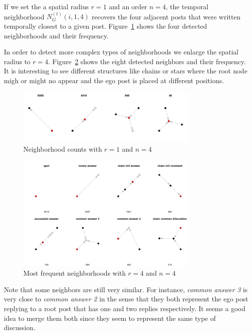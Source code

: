 \documentclass[smallextended]{svjour3}          %
\begin{document}
If we set the a spatial radius $r=1$ and an order $n=4$, the temporal neighborhood $N_{G}^{(t)}(i, 1, 4)$ recovers the four adjacent posts that were written temporally closest to a given post. Figure~\ref{fig:neighborhoods_1_4} shows the four detected neighborhoods and their frequency.

In order to detect more complex types of neighborhoods we enlarge the spatial radius to $r=4$. Figure~\ref{fig:neighborhoods_4_4} shows the eight detected neighbors and their frequency. It is interesting to see different structures like chains or stars where the root node migh or might no appear and the ego post is placed at different positions.

\begin{figure}
	\centering
	\includegraphics[width=0.8\textwidth]{neighborhoods_1_4}
	\caption{Neighborhood counts with $r=1$ and $n=4$}
	\label{fig:neighborhoods_1_4}
\end{figure}

\begin{figure}
	\centering
	\includegraphics[width=0.8\textwidth]{neighborhoods_4_4}
	\caption{Most frequent neighborhoods with $r=4$ and $n=4$}
	\label{fig:neighborhoods_4_4}
\end{figure}

Note that some neighbors are still very similar. For instance, \textit{common answer 3} is very close to \textit{common answer 2} in the sense that they both represent the ego post replying to a root post that has one and two replies respectively. It seems a good idea to merge them both since they seem to represent the same type of discussion.
\end{document}
